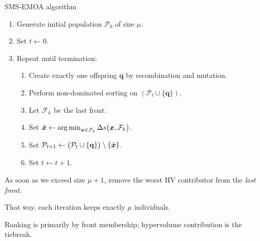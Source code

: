 \documentclass[11pt,compress,t,notes=noshow,xcolor=table]{beamer}
\begin{document}
\begin{framev}{SMS-EMOA algorithm}
\begin{algorithm}[H]
\caption{SMS-EMOA}
\begin{enumerate}
\item Generate initial population $\mathcal{P}_0$ of size $\mu$.
\item Set $t \gets 0$.
\item Repeat until termination:
\begin{enumerate}
\item Create exactly one offspring $\mathbf{q}$ by recombination and mutation.
\item Perform non-dominated sorting on $(\mathcal{P}_t \cup \{\mathbf{q}\})$.
\item Let $\mathcal{F}_k$ be the last front.
\item Set $\tilde{\bm{x}} \gets \mathop{\mathrm{arg\,min}}_{\bm{x} \in \mathcal{F}_k} \Delta s\bigl(\bm{x},\mathcal{F}_k\bigr)$.
\item Set $\mathcal{P}_{t+1} \gets \bigl(\mathcal{P}_t \cup \{\mathbf{q}\}\bigr)\setminus\{\tilde{\bm{x}}\}$.
\item Set $t \gets t + 1$.
\end{enumerate}
\end{enumerate}
\end{algorithm}
\begin{itemizeS}[footnotesize]
\item As soon as we exceed size $\mu+1$, remove the worst HV contributor from the \emph{last front}.
\item That way, each iteration keeps exactly $\mu$ individuals.
\item Ranking is primarily by front membership; hypervolume contribution is the tiebreak.
\end{itemizeS}
\end{framev}

\endlecture
\end{document}
